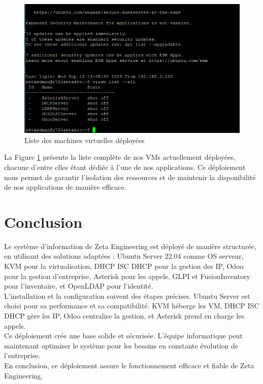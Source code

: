 \begin{figure}[H]
\centering
\includegraphics[width=15cm]{Images/virsh-listall.png}
\caption{Liste des machines virtuelles déployées}
\label{fig:vm-list}
\end{figure}

La Figure \ref{fig:vm-list} présente la liste complète de nos VMs actuellement déployées, chacune d'entre elles étant dédiée à l'une de nos applications. Ce déploiement nous permet de garantir l'isolation des ressources et de maintenir la disponibilité de nos applications de manière efficace.



\section{Conclusion}

Le système d'information de Zeta Engineering est déployé de manière structurée, en utilisant des solutions adaptées : Ubuntu Server 22.04 comme OS serveur, KVM pour la virtualisation, DHCP ISC DHCP pour la gestion des IP, Odoo pour la gestion d'entreprise, Asterisk pour les appels, GLPI et FusionInventory pour l'inventaire, et OpenLDAP pour l'identité.\\

L'installation et la configuration suivent des étapes précises. Ubuntu Server est choisi pour sa performance et sa compatibilité. KVM héberge les VM, DHCP ISC DHCP gère les IP, Odoo centralise la gestion, et Asterisk prend en charge les appels.\\

Ce déploiement crée une base solide et sécurisée. L'équipe informatique peut maintenant optimiser le système pour les besoins en constante évolution de l'entreprise.\\

En conclusion, ce déploiement assure le fonctionnement efficace et fiable de Zeta Engineering.\\
